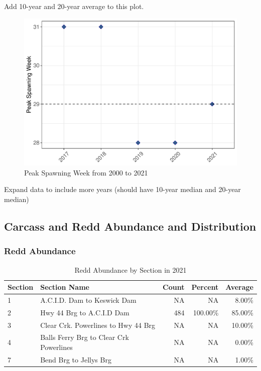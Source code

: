 \documentclass[
]{book}
\theoremstyle{definition}
\theoremstyle{definition}
\theoremstyle{definition}
\theoremstyle{definition}
\theoremstyle{remark}
\begin{document}
Add 10-year and 20-year average to this plot.

\begin{figure}
\centering
\includegraphics{_main_files/figure-latex/spawnweek-fig-1.pdf}
\caption{\label{fig:spawnweek-fig}Peak Spawning Week from 2000 to 2021}
\end{figure}

Expand data to include more years (should have 10-year median and 20-year median)

\hypertarget{carcass-and-redd-abundance-and-distribution}{%
\subsection{Carcass and Redd Abundance and Distribution}\label{carcass-and-redd-abundance-and-distribution}}

\hypertarget{redd-abundance}{%
\subsubsection{Redd Abundance}\label{redd-abundance}}

\begin{table}
\centering
\caption{Redd Abundance by Section in 2021}
\centering
\begin{tabular}[t]{llrrr}
\hline
Section & Section Name & Count & Percent & Average\\
\hline
1 & A.C.I.D. Dam to Keswick Dam & NA & NA & 8.00\%\\
\hline
2 & Hwy 44 Brg to A.C.I.D Dam & 484 & 100.00\% & 85.00\%\\
\hline
3 & Clear Crk. Powerlines to Hwy 44 Brg & NA & NA & 10.00\%\\
\hline
4 & Balls Ferry Brg to Clear Crk Powerlines & NA & NA & 0.00\%\\
\hline
7 & Bend Brg to Jellys Brg & NA & NA & 1.00\%\\
\hline
\end{tabular}
\end{table}
\end{document}
